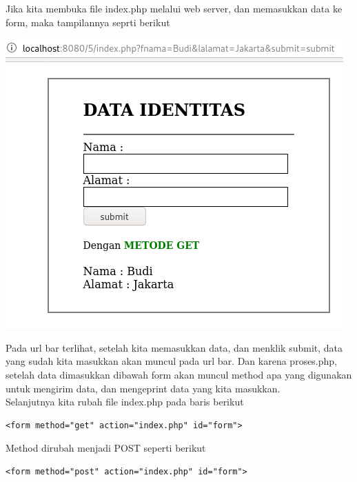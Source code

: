 \documentclass[a4paper,12pt]{article}
\begin{document}
Jika kita membuka file index.php melalui web server, dan memasukkan data ke form, maka tampilannya seprti berikut
\begin{center}
    \includegraphics[scale=.6]{3.png} 
\end{center}
Pada url bar terlihat, setelah kita memasukkan data, dan menklik submit, data yang sudah kita masukkan akan muncul pada url bar. Dan karena proses.php, setelah data dimasukkan
dibawah form akan muncul method apa yang digunakan untuk mengirim data, dan mengeprint data yang kita masukkan.\\[2ex]

Selanjutnya kita rubah file index.php pada baris berikut
\begin{lstlisting}[style=PHP]
<form method="get" action="index.php" id="form">
\end{lstlisting}
Method dirubah menjadi POST seperti berikut
\begin{lstlisting}[style=PHP]
<form method="post" action="index.php" id="form">
\end{lstlisting}
\end{document}
